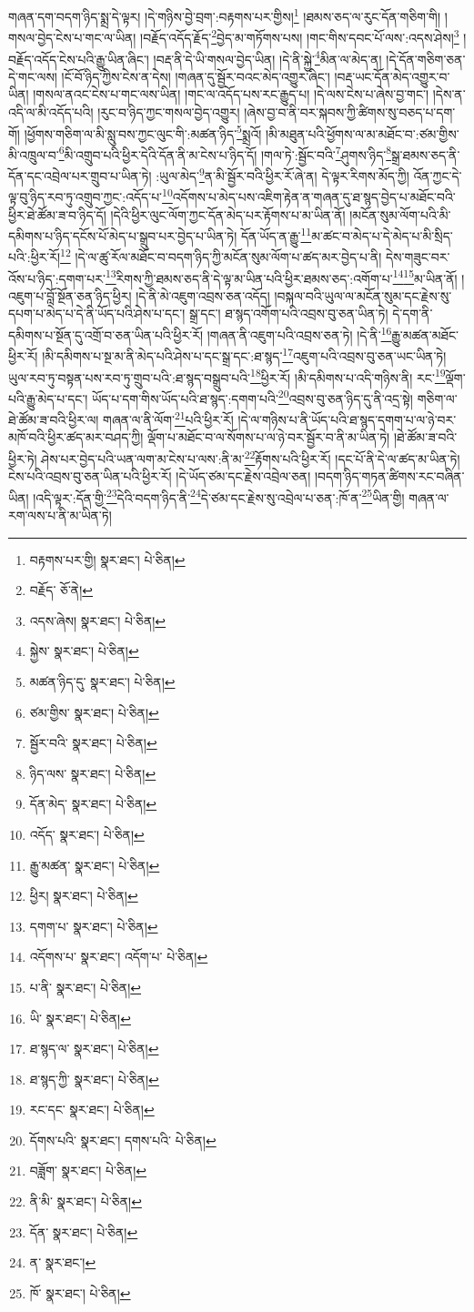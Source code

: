གཞན་དག་བདག་ཉིད་སྨྲ་དེ་ལྟར། །དེ་གཉིས་བྱེ་བྲག་:བརྟགས་པར་གྱིས།\footnote{བརྟགས་པར་གྱི།  སྣར་ཐང་།  པེ་ཅིན། } །ཐམས་ཅད་ལ་རུང་དོན་གཅིག་གི། །གསལ་བྱེད་ངེས་པ་གང་ལ་ཡིན། །བརྗོད་འདོད་རྗོད་\footnote{བརྗོད་  ཅོ་ནེ། }བྱེད་མ་གཏོགས་པས། །གང་གིས་དབང་པོ་ལས་:འདས་ཤེས།\footnote{འདས་ཞེས།  སྣར་ཐང་།  པེ་ཅིན། } །བརྗོད་འདོད་ངེས་པའི་རྒྱུ་ཡིན་ཞིང་། །བརྡ་ནི་དེ་ཡི་གསལ་བྱེད་ཡིན། །དེ་ནི་སྐྱེ་\footnote{སྐྱེས་  སྣར་ཐང་།  པེ་ཅིན། }མིན་ལ་མེད་ན། །དེ་དོན་གཅིག་ཅན་དེ་གང་ལས། །ངོ་བོ་ཉིད་ཀྱིས་ངེས་ན་དེས། །གཞན་དུ་སྦྱོར་བའང་མེད་འགྱུར་ཞིང་། །བརྡ་ཡང་དོན་མེད་འགྱུར་བ་ཡིན། །གསལ་ནའང་ངེས་པ་གང་ལས་ཡིན། །གང་ལ་འདོད་པས་རང་རྒྱུད་པ། །དེ་ལས་ངེས་པ་ཞེས་བྱ་གང་། །དེས་ན་འདི་ལ་མི་འདོད་པའི། །རུང་བ་ཉིད་ཀྱང་གསལ་བྱེད་འགྱུར། །ཞེས་བྱ་བ་ནི་བར་སྐབས་ཀྱི་ཚིགས་སུ་བཅད་པ་དག་གོ། །ཕྱོགས་གཅིག་ལ་མི་སླུ་བས་ཀྱང་ལུང་གི་:མཚན་ཉིད་\footnote{མཚན་ཉིད་དུ་  སྣར་ཐང་།  པེ་ཅིན། }སྨྲའོ། །མི་མཐུན་པའི་ཕྱོགས་ལ་མ་མཐོང་བ་:ཙམ་གྱིས་མི་འཁྲུལ་བ་\footnote{ཙམ་གྱིས་  སྣར་ཐང་།  པེ་ཅིན། }མི་འགྲུབ་པའི་ཕྱིར་དེའི་དོན་ནི་མ་ངེས་པ་ཉིད་དོ། །གལ་ཏེ་:སྦྱོང་བའི་\footnote{སྦྱོར་བའི་  སྣར་ཐང་།  པེ་ཅིན། }ཤུགས་ཉིད་\footnote{ཉིད་ལས་  སྣར་ཐང་།  པེ་ཅིན། }སྒྲ་ཐམས་ཅད་ནི་དོན་དང་འབྲེལ་པར་གྲུབ་པ་ཡིན་ཏེ། :ཡུལ་མེད་\footnote{དོན་མེད་  སྣར་ཐང་།  པེ་ཅིན། }ན་མི་སྦྱོར་བའི་ཕྱིར་རོ་ཞེ་ན། དེ་ལྟར་རིགས་མོད་ཀྱི། འོན་ཀྱང་དེ་ལྟ་བུ་ཉིད་རབ་ཏུ་འགྲུབ་ཀྱང་:འདོད་པ་\footnote{འདོད་  སྣར་ཐང་།  པེ་ཅིན། }འདོགས་པ་མེད་པས་འཇིག་རྟེན་ན་གཞན་དུ་ཐ་སྙད་བྱེད་པ་མཐོང་བའི་ཕྱིར་ཐེ་ཚོམ་ཟ་བ་ཉིད་དོ། །དེའི་ཕྱིར་ལུང་ལོག་ཀྱང་དོན་མེད་པར་རྟོགས་པ་མ་ཡིན་ནོ། །མངོན་སུམ་ལོག་པའི་མི་དམིགས་པ་ཉིད་དངོས་པོ་མེད་པ་སྒྲུབ་པར་བྱེད་པ་ཡིན་ཏེ། དོན་ཡོད་ན་རྒྱུ་\footnote{རྒྱུ་མཚན་  སྣར་ཐང་།  པེ་ཅིན། }མ་ཚང་བ་མེད་པ་དེ་མེད་པ་མི་སྲིད་པའི་:ཕྱིར་རོ།\footnote{ཕྱིར།  སྣར་ཐང་།  པེ་ཅིན། } །དེ་ལ་ཚུ་རོལ་མཐོང་བ་བདག་ཉིད་ཀྱི་མངོན་སུམ་ལོག་པ་ཚད་མར་བྱེད་པ་ནི། དེས་གཟུང་བར་འོས་པ་ཉིད་:དགག་པར་\footnote{དགག་པ་  སྣར་ཐང་།  པེ་ཅིན། }རིགས་ཀྱི་ཐམས་ཅད་ནི་དེ་ལྟ་མ་ཡིན་པའི་ཕྱིར་ཐམས་ཅད་:འགོག་པ་\footnote{འདོགས་པ་  སྣར་ཐང་། འདོག་པ་  པེ་ཅིན། }\footnote{པ་ནི་  སྣར་ཐང་།  པེ་ཅིན། }མ་ཡིན་ནོ། །འཇུག་པ་བློ་སྔོན་ཅན་ཉིད་ཕྱིར། །དེ་ནི་མེ་འཇུག་འབྲས་ཅན་འདོད། །བསྐལ་བའི་ཡུལ་ལ་མངོན་སུམ་དང་རྗེས་སུ་དཔག་པ་མེད་པ་དེ་ནི་ཡོད་པའི་ཤེས་པ་དང་། སྒྲ་དང་། ཐ་སྙད་འགོག་པའི་འབྲས་བུ་ཅན་ཡིན་ཏེ། དེ་དག་ནི་དམིགས་པ་སྔོན་དུ་འགྲོ་བ་ཅན་ཡིན་པའི་ཕྱིར་རོ། །གཞན་ནི་འཇུག་པའི་འབྲས་ཅན་ཏེ། །དེ་ནི་\footnote{ཡི་  སྣར་ཐང་།  པེ་ཅིན། }རྒྱུ་མཚན་མཐོང་ཕྱིར་རོ། །མི་དམིགས་པ་སྔ་མ་ནི་མེད་པའི་ཤེས་པ་དང་སྒྲ་དང་:ཐ་སྙད་\footnote{ཐ་སྙད་ལ་  སྣར་ཐང་།  པེ་ཅིན། }འཇུག་པའི་འབྲས་བུ་ཅན་ཡང་ཡིན་ཏེ། ཡུལ་རབ་ཏུ་བསྟན་པས་རབ་ཏུ་གྲུབ་པའི་:ཐ་སྙད་བསྒྲུབ་པའི་\footnote{ཐ་སྙད་ཀྱི་  སྣར་ཐང་།  པེ་ཅིན། }ཕྱིར་རོ། །མི་དམིགས་པ་འདི་གཉིས་ནི། རང་\footnote{རང་དང་  སྣར་ཐང་།  པེ་ཅིན། }ལྡོག་པའི་རྒྱུ་མེད་པ་དང་། ཡོད་པ་དག་གིས་ཡོད་པའི་ཐ་སྙད་:དགག་པའི་\footnote{དོགས་པའི་  སྣར་ཐང་། དགས་པའི་  པེ་ཅིན། }འབྲས་བུ་ཅན་ཉིད་དུ་ནི་འདྲ་སྟེ། གཅིག་ལ་ཐེ་ཚོམ་ཟ་བའི་ཕྱིར་ལ། གཞན་ལ་ནི་ལོག་\footnote{བཟློག་  སྣར་ཐང་།  པེ་ཅིན། }པའི་ཕྱིར་རོ། །དེ་ལ་གཉིས་པ་ནི་ཡོད་པའི་ཐ་སྙད་དགག་པ་ལ་ཉེ་བར་མཁོ་བའི་ཕྱིར་ཚད་མར་བཤད་ཀྱི། ལྡོག་པ་མཐོང་བ་ལ་སོགས་པ་ལ་ཉེ་བར་སྦྱོར་བ་ནི་མ་ཡིན་ཏེ། །ཐེ་ཚོམ་ཟ་བའི་ཕྱིར་ཏེ། ཤེས་པར་བྱེད་པའི་ཡན་ལག་མ་ངེས་པ་ལས་:ནི་མ་\footnote{ནི་མི་  སྣར་ཐང་།  པེ་ཅིན། }རྟོགས་པའི་ཕྱིར་རོ། །དང་པོ་ནི་དེ་ལ་ཚད་མ་ཡིན་ཏེ། ངེས་པའི་འབྲས་བུ་ཅན་ཡིན་པའི་ཕྱིར་རོ། །དེ་ཡོད་ཙམ་དང་རྗེས་འབྲེལ་ཅན། །བདག་ཉིད་གཏན་ཚིགས་རང་བཞིན་ཡིན། །འདི་ལྟར་:དོན་གྱི་\footnote{དོན་  སྣར་ཐང་།  པེ་ཅིན། }དེའི་བདག་ཉིད་ནི་\footnote{ན་  སྣར་ཐང་། }དེ་ཙམ་དང་རྗེས་སུ་འབྲེལ་པ་ཅན་:ཁོ་ན་\footnote{ཁོ་  སྣར་ཐང་།  པེ་ཅིན། }ཡིན་གྱི། གཞན་ལ་རག་ལས་པ་ནི་མ་ཡིན་ཏེ། 